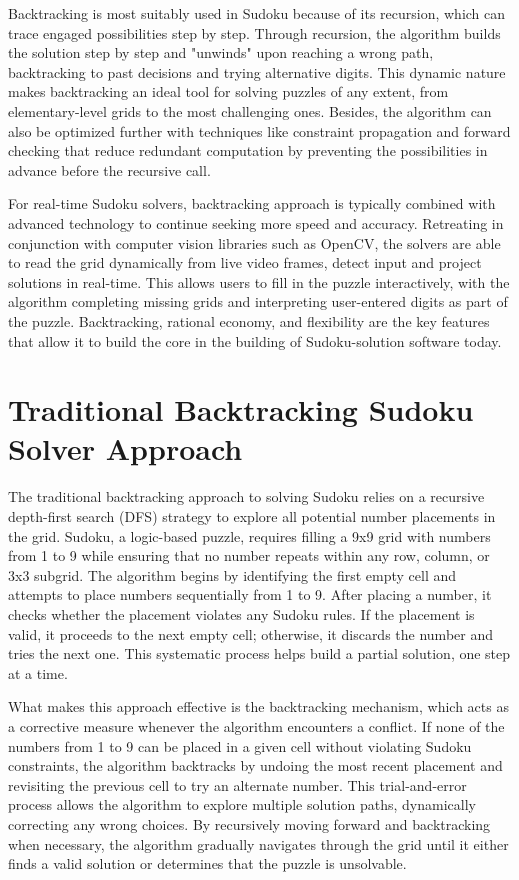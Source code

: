 \documentclass[conference]{IEEEtran}
\begin{document}
Backtracking is most suitably used in Sudoku because of its recursion, which can trace engaged possibilities step by step. Through recursion, the algorithm builds the solution step by step and "unwinds" upon reaching a wrong path, backtracking to past decisions and trying alternative digits. This dynamic nature makes backtracking an ideal tool for solving puzzles of any extent, from elementary-level grids to the most challenging ones. Besides, the algorithm can also be optimized further with techniques like constraint propagation and forward checking that reduce redundant computation by preventing the possibilities in advance before the recursive call.

For real-time Sudoku solvers, backtracking approach is typically combined with advanced technology to continue seeking more speed and accuracy. Retreating in conjunction with computer vision libraries such as OpenCV, the solvers are able to read the grid dynamically from live video frames, detect input and project solutions in real-time. This allows users to fill in the puzzle interactively, with the algorithm completing missing grids and interpreting user-entered digits as part of the puzzle. Backtracking, rational economy, and flexibility are the key features that allow it to build the core in the building of Sudoku-solution software today.

\section{Traditional Backtracking Sudoku Solver Approach} 


The traditional backtracking approach to solving Sudoku relies on a recursive depth-first search (DFS) strategy to explore all potential number placements in the grid. Sudoku, a logic-based puzzle, requires filling a 9x9 grid with numbers from 1 to 9 while ensuring that no number repeats within any row, column, or 3x3 subgrid. The algorithm begins by identifying the first empty cell and attempts to place numbers sequentially from 1 to 9. After placing a number, it checks whether the placement violates any Sudoku rules. If the placement is valid, it proceeds to the next empty cell; otherwise, it discards the number and tries the next one. This systematic process helps build a partial solution, one step at a time.  

What makes this approach effective is the backtracking mechanism, which acts as a corrective measure whenever the algorithm encounters a conflict. If none of the numbers from 1 to 9 can be placed in a given cell without violating Sudoku constraints, the algorithm backtracks by undoing the most recent placement and revisiting the previous cell to try an alternate number. This trial-and-error process allows the algorithm to explore multiple solution paths, dynamically correcting any wrong choices. By recursively moving forward and backtracking when necessary, the algorithm gradually navigates through the grid until it either finds a valid solution or determines that the puzzle is unsolvable.  
\end{document}
